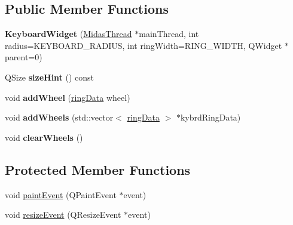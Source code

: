 \subsection*{Public Member Functions}
\begin{DoxyCompactItemize}
\item 
\hypertarget{class_keyboard_widget_a5df7f47d489d18b4b34ecf2ca5ebf1f9}{{\bfseries Keyboard\+Widget} (\hyperlink{class_midas_thread}{Midas\+Thread} $\ast$main\+Thread, int radius=K\+E\+Y\+B\+O\+A\+R\+D\+\_\+\+R\+A\+D\+I\+U\+S, int ring\+Width=R\+I\+N\+G\+\_\+\+W\+I\+D\+T\+H, Q\+Widget $\ast$parent=0)}\label{class_keyboard_widget_a5df7f47d489d18b4b34ecf2ca5ebf1f9}

\item 
\hypertarget{class_keyboard_widget_a791b975e1baab42d92ff008a4d34aeed}{Q\+Size {\bfseries size\+Hint} () const }\label{class_keyboard_widget_a791b975e1baab42d92ff008a4d34aeed}

\item 
\hypertarget{class_keyboard_widget_adc27de22ba863f82a0d45f7473db5721}{void {\bfseries add\+Wheel} (\hyperlink{classring_data}{ring\+Data} wheel)}\label{class_keyboard_widget_adc27de22ba863f82a0d45f7473db5721}

\item 
\hypertarget{class_keyboard_widget_ad547f89e2a279c14f4f02f261e967744}{void {\bfseries add\+Wheels} (std\+::vector$<$ \hyperlink{classring_data}{ring\+Data} $>$ $\ast$kybrd\+Ring\+Data)}\label{class_keyboard_widget_ad547f89e2a279c14f4f02f261e967744}

\item 
\hypertarget{class_keyboard_widget_a9379022567311a6dc988a8efc604137b}{void {\bfseries clear\+Wheels} ()}\label{class_keyboard_widget_a9379022567311a6dc988a8efc604137b}

\end{DoxyCompactItemize}
\subsection*{Protected Member Functions}
\begin{DoxyCompactItemize}
\item 
void \hyperlink{class_keyboard_widget_a75a70cbeb00ec6581d6a243ab033903e}{paint\+Event} (Q\+Paint\+Event $\ast$event)
\item 
void \hyperlink{class_keyboard_widget_af98f1bf8517c0936cd6ab33670f99d70}{resize\+Event} (Q\+Resize\+Event $\ast$event)
\end{DoxyCompactItemize}



